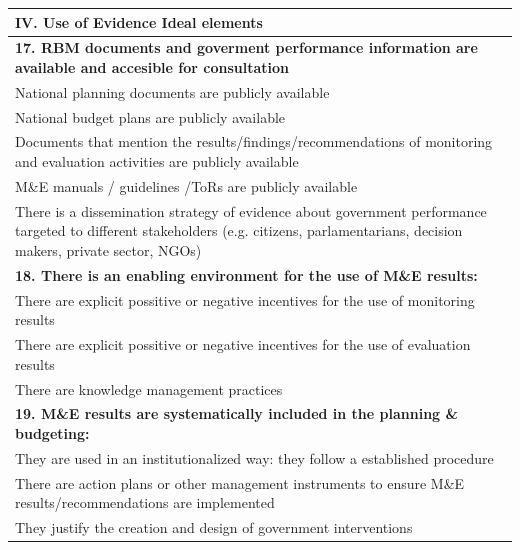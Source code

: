 \documentclass[
  10pt,
]{book}
\begin{document}
\begin{table}
\centering
\begin{tabular}[t]{l}
\hline
IV. Use of Evidence Ideal elements\\
\hline
\multicolumn{1}{l}{\textbf{17. RBM documents and goverment performance information are available and accesible for consultation}}\\
\hline
\hspace{1em}National planning documents are publicly available\\
\hline
\hspace{1em}National budget plans are publicly available\\
\hline
\hspace{1em}Documents that mention the results/findings/recommendations of monitoring and evaluation activities are publicly available\\
\hline
\hspace{1em}M\&E manuals / guidelines /ToRs are publicly available\\
\hline
\hspace{1em}There is a dissemination strategy of evidence about government performance targeted to different stakeholders (e.g. citizens, parlamentarians, decision makers, private sector, NGOs)\\
\hline
\multicolumn{1}{l}{\textbf{18. There is an enabling environment for the use of M\&E results:}}\\
\hline
\hspace{1em}There are explicit possitive or negative incentives for the use of monitoring results\\
\hline
\hspace{1em}There are explicit possitive or negative incentives for the use of evaluation results\\
\hline
\hspace{1em}There are knowledge management practices\\
\hline
\multicolumn{1}{l}{\textbf{19. M\&E results are systematically included in the planning \& budgeting:}}\\
\hline
\hspace{1em}They are used in an institutionalized way: they follow a established procedure\\
\hline
\hspace{1em}There are action plans or other management instruments to ensure M\&E results/recommendations are implemented\\
\hline
\hspace{1em}They justify the creation and design of government interventions\\

\end{tabular}
\end{table}
\end{document}
